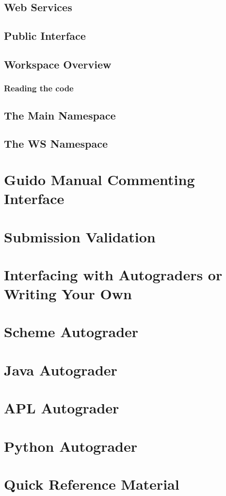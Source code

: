 \section{Web Services}

\section{Public Interface}

\section{Workspace Overview}

\subsection{Reading the code}

\section{The Main Namespace}

\section{The WS Namespace}

\chapter{Guido Manual Commenting Interface}

\chapter{Submission Validation}

\chapter{Interfacing with Autograders or Writing Your Own}

\chapter{Scheme Autograder}

\chapter{Java Autograder}

\chapter{APL Autograder}

\chapter{Python Autograder}

\chapter{Quick Reference Material}

\bye
